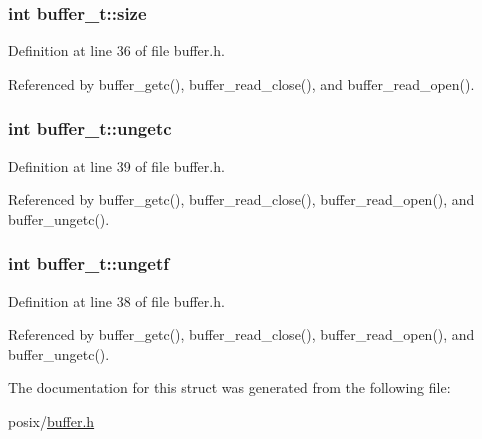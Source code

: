 \subsubsection[{\texorpdfstring{size}{size}}]{\setlength{\rightskip}{0pt plus 5cm}int buffer\+\_\+t\+::size}\hypertarget{structbuffer__t_a34e81d898c6accf4f06ed9c1133d6361}{}\label{structbuffer__t_a34e81d898c6accf4f06ed9c1133d6361}


Definition at line 36 of file buffer.\+h.



Referenced by buffer\+\_\+getc(), buffer\+\_\+read\+\_\+close(), and buffer\+\_\+read\+\_\+open().

\subsubsection[{\texorpdfstring{ungetc}{ungetc}}]{\setlength{\rightskip}{0pt plus 5cm}int buffer\+\_\+t\+::ungetc}\hypertarget{structbuffer__t_aa1fbbf42ce5d6278b21a93647bef3ff1}{}\label{structbuffer__t_aa1fbbf42ce5d6278b21a93647bef3ff1}


Definition at line 39 of file buffer.\+h.



Referenced by buffer\+\_\+getc(), buffer\+\_\+read\+\_\+close(), buffer\+\_\+read\+\_\+open(), and buffer\+\_\+ungetc().

\subsubsection[{\texorpdfstring{ungetf}{ungetf}}]{\setlength{\rightskip}{0pt plus 5cm}int buffer\+\_\+t\+::ungetf}\hypertarget{structbuffer__t_a67c2edddeca1858c670ff57e049a9e0e}{}\label{structbuffer__t_a67c2edddeca1858c670ff57e049a9e0e}


Definition at line 38 of file buffer.\+h.



Referenced by buffer\+\_\+getc(), buffer\+\_\+read\+\_\+close(), buffer\+\_\+read\+\_\+open(), and buffer\+\_\+ungetc().



The documentation for this struct was generated from the following file\+:\begin{DoxyCompactItemize}
\item 
posix/\hyperlink{buffer_8h}{buffer.\+h}\end{DoxyCompactItemize}
